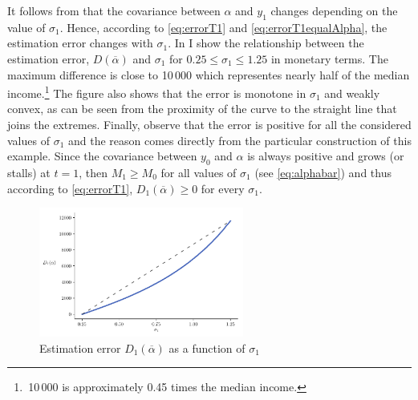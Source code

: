 \documentclass[english, a4paper, 12pt]{article}
\begin{document}
It follows from  that the covariance between $\alpha$ and $y_{1}$ changes depending on the value of $\sigma_{1}$. Hence, according to \eqref{eq:errorT1} and \eqref{eq:errorT1equalAlpha}, the estimation error changes with $\sigma_{1}$. In  I show the relationship between the estimation error, $D(\overline{\alpha})$ and $\sigma_{1}$ for $0.25 \leq \sigma_{1} \leq 1.25$ in monetary terms. The maximum difference is close to 10\,000 which representes nearly half of the median income.\footnote{\,10\,000 is approximately 0.45 times the median income.} The figure also shows that the error is monotone in $\sigma_{1}$ and weakly convex, as can be seen from the proximity of the curve to the straight line that joins the extremes. Finally, observe that the error is positive for all the considered values of $\sigma_{1}$ and the reason comes directly from the particular construction of this example. Since the covariance between $y_{0}$ and $\alpha$ is always positive and grows (or stalls) at $t=1$, then $M_{1} \geq M_{0}$ for all values of $\sigma_{1}$ (see \eqref{eq:alphabar}) and thus according to \eqref{eq:errorT1}, $D_{1}(\overline{\alpha}) \geq 0$ for every $\sigma_{1}$.
	\begin{figure}
		\caption{Estimation error $D_{1}(\overline{\alpha})$ as a function of $\sigma_{1}$}
		\label{fig:RADiffPlot}
		\includegraphics[width = 0.6\textwidth]{RAdiffPlot}
	\end{figure}
	
\end{document}
